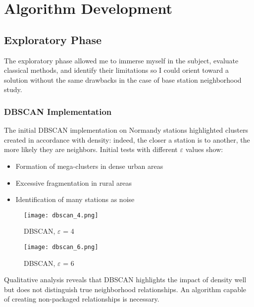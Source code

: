 \documentclass[12pt,a4paper]{report}
\begin{document}
\chapter{Algorithm Development}
\label{chap:algorithmes}

\section{Exploratory Phase}

The exploratory phase allowed me to immerse myself in the subject, evaluate classical methods, and identify their limitations so I could orient toward a solution without the same drawbacks in the case of base station neighborhood study.

\subsection{DBSCAN Implementation}

The initial DBSCAN implementation on Normandy stations highlighted clusters created in accordance with density: indeed, the closer a station is to another, the more likely they are neighbors. Initial tests with different $\varepsilon$ values show:

\begin{itemize}
    \item Formation of mega-clusters in dense urban areas
    \item Excessive fragmentation in rural areas
    \item Identification of many stations as noise
\end{itemize}

\begin{figure}[h]
    \centering
    \begin{minipage}{0.45\textwidth}
        \centering
        \texttt{[image: dbscan\_4.png]}
        \caption{DBSCAN, $\varepsilon$ = 4}
        \label{fig:image1}
    \end{minipage}\hfill
    \begin{minipage}{0.45\textwidth}
        \centering
        \texttt{[image: dbscan\_6.png]}
        \caption{DBSCAN, $\varepsilon$ = 6}
        \label{fig:image2}
    \end{minipage}
\end{figure}

Qualitative analysis reveals that DBSCAN highlights the impact of density well but does not distinguish true neighborhood relationships. An algorithm capable of creating non-packaged relationships is necessary.
\end{document}
